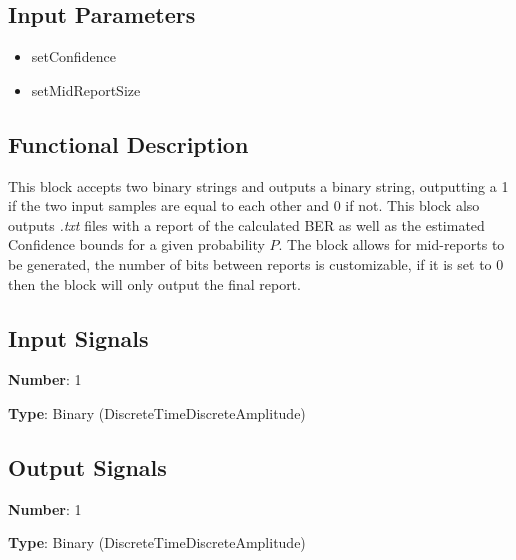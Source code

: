 \documentclass[../../sdf/tex/BPSK_system.tex]{subfiles}
\date{}
\begin{document}
\onlyinsubfile{\maketitle}

\subsection*{Input Parameters}

\begin{multicols}{2}
	\begin{itemize}
		\item setConfidence
		\item setMidReportSize
	\end{itemize}
\end{multicols}

\subsection*{Functional Description}

This block accepts two binary strings and outputs a binary string, outputting a 1 if the two input samples are equal to each other and 0 if not. This block also outputs \textit{.txt} files with a report of the calculated BER as well as the estimated Confidence bounds for a given probability $P$. The block allows for mid-reports to be generated, the number of bits between reports is customizable, if it is set to 0 then the block will only output the final report.

\subsection*{Input Signals}

\textbf{Number}: 1

\textbf{Type}: Binary (DiscreteTimeDiscreteAmplitude)

\subsection*{Output Signals}

\textbf{Number}: 1

\textbf{Type}: Binary (DiscreteTimeDiscreteAmplitude)
\end{document}
